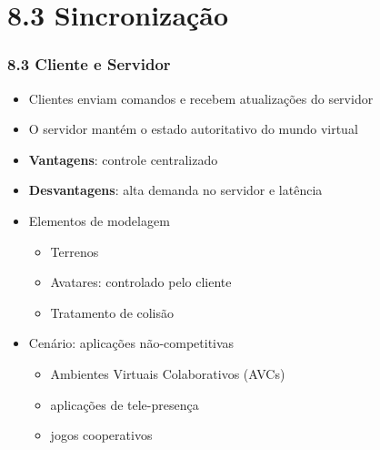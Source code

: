 \documentclass{beamer}
\begin{document}
\section{8.3 Sincronização}

\begin{frame}
  \frametitle{8.3 Cliente e Servidor}
    \begin{itemize}
        \item Clientes enviam comandos e recebem atualizações do servidor
        \item O servidor mantém o estado autoritativo do mundo virtual
        \item \textbf{Vantagens}: controle centralizado
        \item \textbf{Desvantagens}: alta demanda no servidor e latência
        \item Elementos de modelagem
        \begin{itemize}
          \item Terrenos
          \item Avatares: controlado pelo cliente
          \item Tratamento de colisão
        \end{itemize}
        \item Cenário: aplicações não-competitivas
        \begin{itemize}
          \item Ambientes Virtuais Colaborativos (AVCs)
          \item aplicações de tele-presença
          \item jogos cooperativos
        \end{itemize}
    \end{itemize}
\end{frame}
\end{document}
